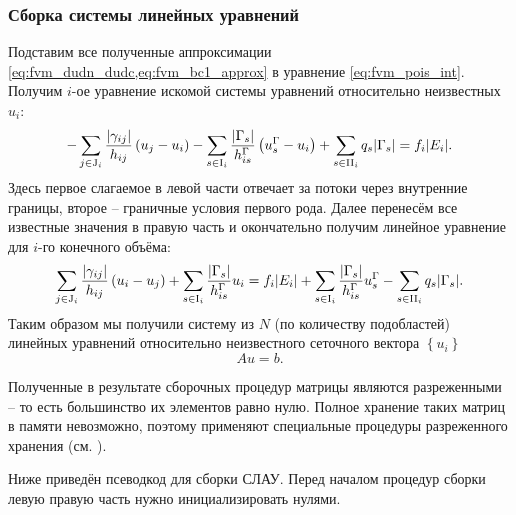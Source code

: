 \subsubsection{Сборка системы линейных уравнений}
Подставим все полученные аппроксимации
\cref{eq:fvm_dudn_dudc,eq:fvm_bc1_approx}
в уравнение \cref{eq:fvm_pois_int}. Получим $i$-ое уравнение искомой системы уравнений относительно неизвестных $u_i$:
\begin{equation*}
-\sum_{j\in {\rm J}_i}
    \frac{|\gamma_{ij}|}{h_{ij}}
         \left(u_j - u_i\right)
-\sum_{s\in{\rm I}_i}
    \frac{|\Gamma_{s}|}{h^\Gamma_{is}}
        \left(u^\Gamma_s - u_i\right)
+\sum_{s\in{\rm II}_i} q_s |\Gamma_s|
=
f_i |E_i|.
\end{equation*}
Здесь первое слагаемое в левой части отвечает за потоки через внутренние границы,
второе -- граничные условия первого рода.
Далее перенесём все известные значения в правую часть и окончательно
получим линейное уравнение для $i$-го конечного объёма:
\begin{equation}
\label{eq:fvm_slae}
\sum_{j\in{\rm J}_i}
    \frac{|\gamma_{ij}|}{h_{ij}}
         \left(u_i - u_j\right)
+\sum_{s\in{\rm I}_i}
    \frac{|\Gamma_{s}|}{h^\Gamma_{is}}u_i
 =
f_i |E_i|
+\sum_{s\in{\rm I}_i}
    \frac{|\Gamma_{s}|}{h^\Gamma_{is}} u_s^\Gamma
-\sum_{s\in{\rm II}_i} q_s |\Gamma_{s}|.
\end{equation}
Таким образом мы получили систему из $N$ (по количеству подобластей) линейных уравнений относительно
неизвестного сеточного вектора $\left\{u_i\right\}$
$$
A u = b.
$$

Полученные в результате сборочных процедур матрицы являются разреженными -- то есть большинство их элементов равно нулю.
Полное хранение таких матриц в памяти невозможно, поэтому применяют специальные процедуры разреженного хранения (см. ).

Ниже приведён псеводкод для сборки СЛАУ. Перед началом процедур сборки левую правую часть нужно инициализировать нулями.

